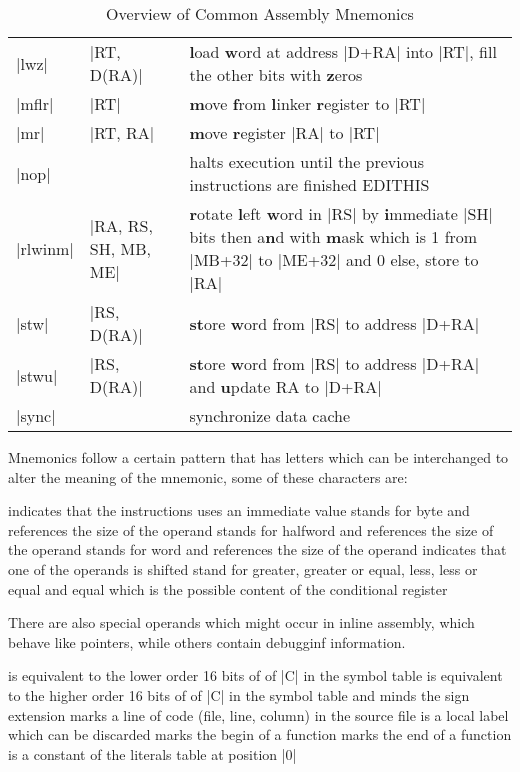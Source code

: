 \begin{table}[htbp]
\begin{tabular}{l l p{9cm}}
    |lwz| & |RT, D(RA)| & \textbf{l}oad \textbf{w}ord at address |D+RA| into |RT|, fill the other bits with \textbf{z}eros \\
    |mflr| & |RT| & \textbf{m}ove \textbf{f}rom \textbf{l}inker \textbf{r}egister to |RT|\\
    |mr| & |RT, RA| & \textbf{m}ove \textbf{r}egister |RA| to |RT| \\
    |nop| & & halts execution until the previous instructions are finished EDITHIS\\
    |rlwinm| & |RA, RS, SH, MB, ME| & \textbf{r}otate \textbf{l}eft \textbf{w}ord in |RS| by \textbf{i}mmediate |SH| bits then a\textbf{n}d with \textbf{m}ask which is 1 from |MB+32| to |ME+32| and 0 else, store to |RA|\\
    |stw| & |RS, D(RA)| & \textbf{st}ore \textbf{w}ord from |RS| to address |D+RA|\\
    |stwu| & |RS, D(RA)| & \textbf{st}ore \textbf{w}ord from |RS| to address |D+RA| and \textbf{u}pdate RA to |D+RA|\\
    |sync| & & synchronize data cache\\
\end{tabular}
\caption {\label{tab:asm} Overview of Common Assembly Mnemonics}
\end{table}

Mnemonics follow a certain pattern that has letters which can be interchanged to alter the meaning of the mnemonic, some of these characters are:
\begin{description}
     indicates that the instructions uses an immediate value
     stands for byte and references the size of the operand
     stands for halfword and references the size of the operand
     stands for word and references the size of the operand
     indicates that one of the operands is shifted
     stand for greater, greater or equal, less, less or equal and equal which is the possible content of the conditional register
\end{description}

There are also special operands which might occur in inline assembly, which behave like pointers, while others contain debugginf information.
\begin{description}
     is equivalent to the lower order 16 bits of of |C| in the symbol table
     is equivalent to the higher order 16 bits of of |C| in the symbol table and minds the sign extension
     marks a line of code (file, line, column) in the source file
     is a local label which can be discarded
     marks the begin of a function
     marks the end of a function
     is a constant of the literals table at position |0|
\end{description}

\newpage
\listoftodos[Notes]

